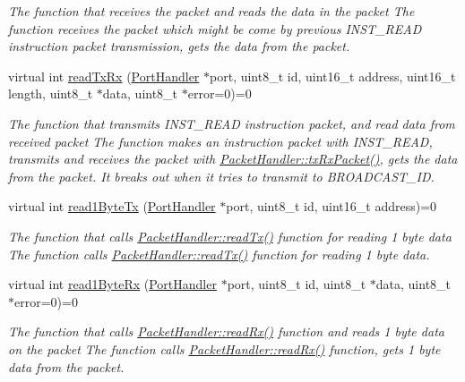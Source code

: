 \begin{DoxyCompactItemize}
\begin{DoxyCompactList}\small\item\em The function that receives the packet and reads the data in the packet  The function receives the packet which might be come by previous I\+N\+S\+T\+\_\+\+R\+E\+AD instruction packet transmission,  gets the data from the packet. \end{DoxyCompactList}\item 
virtual int \hyperlink{classmercury_1_1_packet_handler_ac743a57bba9e71aadb1578f0e704f166}{read\+Tx\+Rx} (\hyperlink{classmercury_1_1_port_handler}{Port\+Handler} $\ast$port, uint8\+\_\+t id, uint16\+\_\+t address, uint16\+\_\+t length, uint8\+\_\+t $\ast$data, uint8\+\_\+t $\ast$error=0)=0
\begin{DoxyCompactList}\small\item\em The function that transmits I\+N\+S\+T\+\_\+\+R\+E\+AD instruction packet, and read data from received packet  The function makes an instruction packet with I\+N\+S\+T\+\_\+\+R\+E\+AD,  transmits and receives the packet with \hyperlink{classmercury_1_1_packet_handler_ac7ceeaec210827d119199144badaad3a}{Packet\+Handler\+::tx\+Rx\+Packet()},  gets the data from the packet.  It breaks out  when it tries to transmit to B\+R\+O\+A\+D\+C\+A\+S\+T\+\_\+\+ID. \end{DoxyCompactList}\item 
virtual int \hyperlink{classmercury_1_1_packet_handler_a2da3f399926be08a5a436e3eaefd0766}{read1\+Byte\+Tx} (\hyperlink{classmercury_1_1_port_handler}{Port\+Handler} $\ast$port, uint8\+\_\+t id, uint16\+\_\+t address)=0
\begin{DoxyCompactList}\small\item\em The function that calls \hyperlink{classmercury_1_1_packet_handler_a58220a79dcdff959241bd5688e6dbb1a}{Packet\+Handler\+::read\+Tx()} function for reading 1 byte data  The function calls \hyperlink{classmercury_1_1_packet_handler_a58220a79dcdff959241bd5688e6dbb1a}{Packet\+Handler\+::read\+Tx()} function for reading 1 byte data. \end{DoxyCompactList}\item 
virtual int \hyperlink{classmercury_1_1_packet_handler_a0162ef35e4e4e3faa1f2130728e7cee3}{read1\+Byte\+Rx} (\hyperlink{classmercury_1_1_port_handler}{Port\+Handler} $\ast$port, uint8\+\_\+t id, uint8\+\_\+t $\ast$data, uint8\+\_\+t $\ast$error=0)=0
\begin{DoxyCompactList}\small\item\em The function that calls \hyperlink{classmercury_1_1_packet_handler_a0857bd487c48ea83fc2b93e1e3e80200}{Packet\+Handler\+::read\+Rx()} function and reads 1 byte data on the packet  The function calls \hyperlink{classmercury_1_1_packet_handler_a0857bd487c48ea83fc2b93e1e3e80200}{Packet\+Handler\+::read\+Rx()} function,  gets 1 byte data from the packet. \end{DoxyCompactList}\item 

\end{DoxyCompactItemize}

